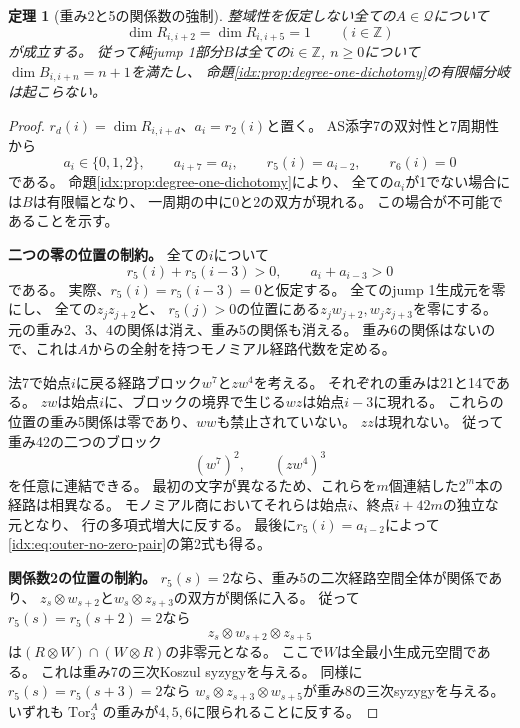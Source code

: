 \documentclass[11pt,a4paper]{ltjsarticle}
\newtheorem{theorem}{定理}[section]
\theoremstyle{definition}
\begin{document}
\begin{theorem}[重み2と5の関係数の強制]
\label{idx:thm:outer-relation-ranks}
整域性を仮定しない全ての$A\in\mathcal Q$について
\[
\dim R_{i,i+2}=\dim R_{i,i+5}=1
\qquad(i\in\mathbb Z)
\]
が成立する。
従って純jump 1部分$B$は全ての$i\in\mathbb Z$, $n\geq0$について
$\dim B_{i,i+n}=n+1$を満たし、
命題\ref{idx:prop:degree-one-dichotomy}の有限幅分岐は起こらない。
\end{theorem}
\begin{proof}
$r_d(i)=\dim R_{i,i+d}$、$a_i=r_2(i)$と置く。
AS添字7の双対性と7周期性から
\[
a_i\in\{0,1,2\},\qquad a_{i+7}=a_i,\qquad
r_5(i)=a_{i-2},\qquad r_6(i)=0
\]
である。
命題\ref{idx:prop:degree-one-dichotomy}により、
全ての$a_i$が1でない場合には$B$は有限幅となり、
一周期の中に0と2の双方が現れる。
この場合が不可能であることを示す。

\par\smallskip\noindent\textbf{二つの零の位置の制約。}\quad
全ての$i$について
\begin{equation}\label{idx:eq:outer-no-zero-pair}
r_5(i)+r_5(i-3)>0,\qquad a_i+a_{i-3}>0
\end{equation}
である。
実際、$r_5(i)=r_5(i-3)=0$と仮定する。
全てのjump 1生成元を零にし、
全ての$z_jz_{j+2}$と、
$r_5(j)>0$の位置にある$z_jw_{j+2},w_jz_{j+3}$を零にする。
元の重み2、3、4の関係は消え、重み5の関係も消える。
重み6の関係はないので、これは$A$からの全射を持つモノミアル経路代数を定める。

法7で始点$i$に戻る経路ブロック$w^7$と$zw^4$を考える。
それぞれの重みは21と14である。
$zw$は始点$i$に、ブロックの境界で生じる$wz$は始点$i-3$に現れる。
これらの位置の重み5関係は零であり、$ww$も禁止されていない。
$zz$は現れない。
従って重み42の二つのブロック
\[
(w^7)^2,\qquad(zw^4)^3
\]
を任意に連結できる。
最初の文字が異なるため、これらを$m$個連結した$2^m$本の経路は相異なる。
モノミアル商においてそれらは始点$i$、終点$i+42m$の独立な元となり、
行の多項式増大に反する。
最後に$r_5(i)=a_{i-2}$によって
\eqref{idx:eq:outer-no-zero-pair}の第2式も得る。

\par\smallskip\noindent\textbf{関係数2の位置の制約。}\quad
$r_5(s)=2$なら、重み5の二次経路空間全体が関係であり、
$z_s\otimes w_{s+2}$と$w_s\otimes z_{s+3}$の双方が関係に入る。
従って$r_5(s)=r_5(s+2)=2$なら
\[
z_s\otimes w_{s+2}\otimes z_{s+5}
\]
は$(R\otimes W)\cap(W\otimes R)$の非零元となる。
ここで$W$は全最小生成元空間である。
これは重み7の三次Koszul syzygyを与える。
同様に$r_5(s)=r_5(s+3)=2$なら
$w_s\otimes z_{s+3}\otimes w_{s+5}$が重み8の三次syzygyを与える。
いずれも$\operatorname{Tor}_3^A$の重みが$4,5,6$に限られることに反する。


\end{proof}
\end{document}
